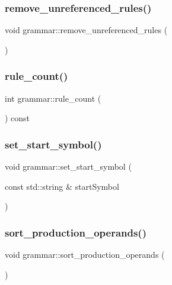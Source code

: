 \mbox{\label{classgrammar_ac0ec80f1ed9e863f1367a92a2d9393dc}} 
\subsubsection{\texorpdfstring{remove\_unreferenced\_rules()}{remove\_unreferenced\_rules()}}
{\footnotesize\ttfamily void grammar\+::remove\+\_\+unreferenced\+\_\+rules (\begin{DoxyParamCaption}{ }\end{DoxyParamCaption})}

\mbox{\label{classgrammar_a5a3bc8f800c26c55673bca0399e471d2}} 
\subsubsection{\texorpdfstring{rule\_count()}{rule\_count()}}
{\footnotesize\ttfamily int grammar\+::rule\+\_\+count (\begin{DoxyParamCaption}{ }\end{DoxyParamCaption}) const}

\mbox{\label{classgrammar_ac0fc0535d0b161a1d6ca2ccc8e057aa0}} 
\subsubsection{\texorpdfstring{set\_start\_symbol()}{set\_start\_symbol()}}
{\footnotesize\ttfamily void grammar\+::set\+\_\+start\+\_\+symbol (\begin{DoxyParamCaption}\item[{const std\+::string \&}]{start\+Symbol }\end{DoxyParamCaption})}

\mbox{\label{classgrammar_ae3145b76d7016e89e749a609eac53f5c}} 
\subsubsection{\texorpdfstring{sort\_production\_operands()}{sort\_production\_operands()}}
{\footnotesize\ttfamily void grammar\+::sort\+\_\+production\+\_\+operands (\begin{DoxyParamCaption}{ }\end{DoxyParamCaption})}

